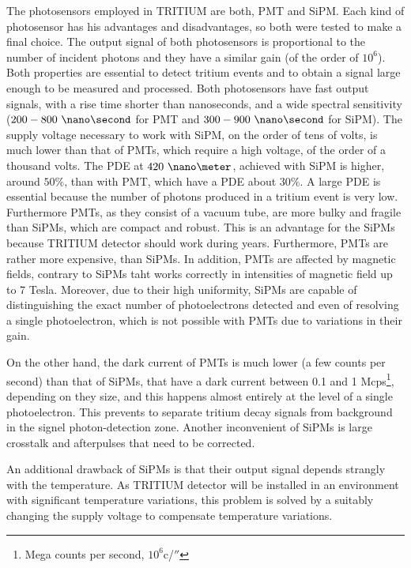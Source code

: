 The photosensors employed in TRITIUM are both, PMT and SiPM. Each kind of photosensor has his advantages and disadvantages, so both were tested to make a final choice. The output signal of both photosensors is proportional to the number of incident photons and they have a similar gain (of the order of $10^6$). Both properties are essential to detect tritium events and to obtain a signal large enough to be measured and processed. Both photosensors have fast output signals, with a rise time shorter than nanoseconds, and a wide spectral sensitivity ($200-800~\nano\second$ for PMT and $300-900~\nano\second$ for SiPM). The supply voltage necessary to work with SiPM, on the order of tens of volts, is much lower than that of PMTs, which require a high voltage, of the order of a thousand volts. The PDE at $420~\nano\meter$,  achieved with SiPM is higher, around $50\%$, than with PMT, which have a PDE about $30\%$. A large PDE is essential because the number of photons produced in a tritium event is very low. Furthermore PMTs, as they consist of a vacuum tube, are more bulky and fragile than SiPMs, which are compact and robust. This is an advantage for the SiPMs because TRITIUM detector should work during years. Furthermore, PMTs are rather more expensive, than SiPMs. In addition, PMTs are affected by magnetic fields, contrary to SiPMs taht works correctly in intensities  of magnetic field up to 7 Tesla. Moreover, due to their high uniformity, SiPMs are capable of distinguishing the exact number of photoelectrons detected and even of resolving a single photoelectron, which is not possible with PMTs due to variations in their gain.

On the other hand, the dark current of PMTs is much lower (a few counts per second) than that of SiPMs, that have a dark current between 0.1 and 1 Mcps\footnote{Mega counts per second, $10^6$c/$\second$}, depending on they size, and this happens almost entirely at the level of a single photoelectron. This prevents to separate tritium decay signals from background in the signel photon-detection zone. Another inconvenient of SiPMs is large crosstalk and afterpulses that need to be corrected.

An additional drawback of SiPMs is that their output signal depends strangly with the temperature. As TRITIUM detector will be installed in an environment with significant temperature variations, this problem is solved by a suitably changing the supply voltage to compensate temperature variations.